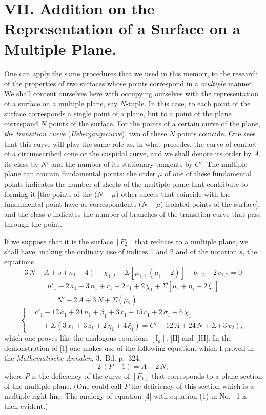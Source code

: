 \documentclass{article}
\begin{document}
\section*{VII. Addition on the Representation of a Surface on a Multiple Plane.}

One can apply the same procedures that we used in this memoir, to the research of the properties of two surfaces whose points correspond in a \emph{multiple} manner. We shall content ourselves here with occupying ourselves with the representation of a surface on a multiple plane, say $N$-tuple. In this case, to each point of the surface corresponds a single point of a plane, but to a point of the plane correspond $N$ points of the surface. For the points of a certain curve of the plane, \emph{the transition curve} (\emph{Uebergangscurve}), two of these $N$ points coincide. One sees that this curve will play the same role as, in what precedes, the curve of contact of a circumscribed cone or the cuspidal curve, and we shall denote its order by $A$, its class by $N'$ and the number of its stationary tangents by $C'$. The multiple plane can contain fundamental points: the order $\mu$ of one of these fundamental points indicates the number of sheets of the multiple plane that contribute to forming it [the points of the ($N - \mu$) other sheets that coincide with the fundamental point have as correspondents ($N - \mu$) isolated points of the surface], and the class $v$ indicates the number of branches of the transition curve that pass through the point.

If we suppose that it is the surface $[F_2]$ that reduces to a multiple plane, we shall have, making the ordinary use of indices 1 and 2 and of the notation $s$, the equations
\[
3\,N - A + s\,(n_1 - 4) - \chi_{1, 2} - \Sigma[\mu_{1, 2}\,(\mu_1 - 2)] - b_{1, 2} - 2\,c_{1, 2} = 0 \tag*{[1]}
\]
\[
\begin{aligned}
n'_1 - 2\,a_1 + 3\,n_1 + r_1 - 2\,c_1 + 2\,\chi_1 + \Sigma[\mu_1 + \eta_1 + 2\,\xi_1] \\
= N' - 2\,A + 3\,N + \Sigma(\mu_2)
\end{aligned} \tag*{[2]}
\]
\[
\left\{
\begin{aligned}
& c'_1 - 12\,a_1 + 24\,n_1 + \beta_1 + 3\,r_1 - 15\,c_1 + 2\,\sigma_1 + 6\,\chi_1 \\
&\quad + \Sigma(3\,x_1 + 3\,z_1 + 2\,\eta_1 + 4\,\xi_1) = C' - 12\,A + 24\,N + \Sigma(3\,v_2),
\end{aligned}
\right. \tag*{[3]}
\]
which one proves like the analogous equations $[\mathrm{I}_a]$, [II] and [III]. In the demonstration of [1] one makes use of the following equation, which I proved in the \emph{Mathematische Annalen}, 3.~Bd. p.~324,
\[
2\,(P - 1) = A - 2\,N, \tag*{[4]}
\]
where $P$ is the deficiency of the curve of $[F_1]$ that corresponds to a plane section of the multiple plane. (One could call $P$ the deficiency of this section which is a multiple right line. The analogy of equation [4] with equation (1) in No.~ 1 is then evident.)
\end{document}
